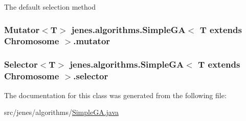The default selection method \hypertarget{classjenes_1_1algorithms_1_1_simple_g_a_3_01_t_01extends_01_chromosome_01_4_a24f14989c009c5422614686c8fc49248}{
\subsubsection[{mutator}]{\setlength{\rightskip}{0pt plus 5cm}Mutator$<$T$>$ jenes.\-algorithms.\-Simple\-G\-A$<$ T extends Chromosome $>$.mutator\hspace{0.3cm}{\ttfamily [private]}}}\label{classjenes_1_1algorithms_1_1_simple_g_a_3_01_t_01extends_01_chromosome_01_4_a24f14989c009c5422614686c8fc49248}
\hypertarget{classjenes_1_1algorithms_1_1_simple_g_a_3_01_t_01extends_01_chromosome_01_4_a2490679bf43c4342c2932181788af8f3}{
\subsubsection[{selector}]{\setlength{\rightskip}{0pt plus 5cm}Selector$<$T$>$ jenes.\-algorithms.\-Simple\-G\-A$<$ T extends Chromosome $>$.selector\hspace{0.3cm}{\ttfamily [private]}}}\label{classjenes_1_1algorithms_1_1_simple_g_a_3_01_t_01extends_01_chromosome_01_4_a2490679bf43c4342c2932181788af8f3}


The documentation for this class was generated from the following file\-:\begin{DoxyCompactItemize}
\item 
src/jenes/algorithms/\hyperlink{_simple_g_a_8java}{Simple\-G\-A.\-java}\end{DoxyCompactItemize}

